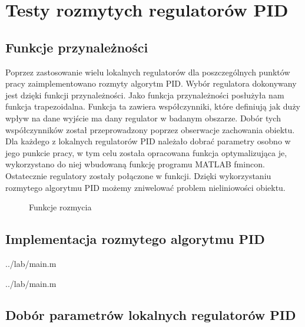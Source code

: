 \section{Testy rozmytych regulatorów PID}
\label{lab:zad4}

\subsection{Funkcje przynależności}
\label{lab:zad4:fuzzyFunction}

Poprzez zastosowanie wielu lokalnych regulatorów dla poszczególnych punktów pracy
zaimplementowano rozmyty algorytm PID. Wybór regulatora dokonywany jest dzięki
funkcji przynależności. Jako funkcja przynależności posłużyła nam funkcja
trapezoidalna. Funkcja ta zawiera współczynniki, które definiują jak duży wpływ na
dane wyjście ma dany regulator w badanym obszarze. Dobór tych współczynników
został przeprowadzony poprzez obserwacje zachowania obiektu. Dla każdego z
lokalnych regulatorów PID należało dobrać parametry osobno w jego punkcie pracy, w
tym celu została opracowana funkcja optymalizująca je, wykorzystano do niej
wbudowaną funkcję programu MATLAB fmincon. Ostatecznie regulatory zostały
połączone w funkcji. Dzięki wykorzystaniu rozmytego algorytmu PID możemy
zniwelować problem nieliniowości obiektu.

\begin{figure}[H] 
    \centering
    
    \caption{Funkcje rozmycia}
    \label{lab:zad4:fuzzyFunction:figure}
 \end{figure}

\newpage

\subsection{Implementacja rozmytego algorytmu PID}
\label{lab:zad4:implPID}


    {../lab/main.m}


    {../lab/main.m}


\newpage

\subsection{Dobór parametrów lokalnych regulatorów PID}
\label{lab:zad4:paramPID}


